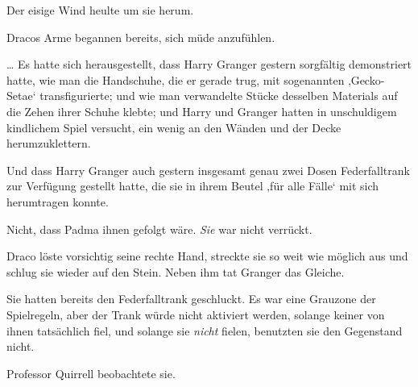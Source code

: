 \later

Der eisige Wind heulte um sie herum.

Dracos Arme begannen bereits, sich müde anzufühlen.

… Es hatte sich herausgestellt, dass Harry Granger gestern sorgfältig demonstriert hatte, wie man die Handschuhe, die er gerade trug, mit sogenannten ‚Gecko-Setae‘ transfigurierte; und wie man verwandelte Stücke desselben Materials auf die Zehen ihrer Schuhe klebte; und Harry und Granger hatten in unschuldigem kindlichem Spiel versucht, ein wenig an den Wänden und der Decke herumzuklettern.

Und dass Harry Granger auch gestern insgesamt genau zwei Dosen Federfalltrank zur Verfügung gestellt hatte, die sie in ihrem Beutel ‚für alle Fälle‘ mit sich herumtragen konnte.

Nicht, dass Padma ihnen gefolgt wäre. \emph{Sie} war nicht verrückt.

Draco löste vorsichtig seine rechte Hand, streckte sie so weit wie möglich aus und schlug sie wieder auf den Stein. Neben ihm tat Granger das Gleiche.

Sie hatten bereits den Federfalltrank geschluckt. Es war eine Grauzone der Spielregeln, aber der Trank würde nicht aktiviert werden, solange keiner von ihnen tatsächlich fiel, und solange sie \emph{nicht} fielen, benutzten sie den Gegenstand nicht.

Professor Quirrell beobachtete sie.

